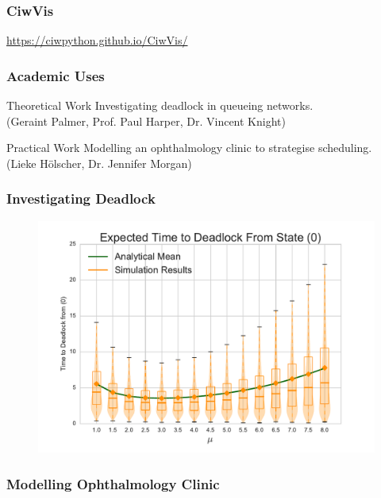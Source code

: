 \documentclass{beamer}
\begin{document}
\begin{frame}
\frametitle{CiwVis}
\begin{center}
\textcolor{darkorange}{\url{https://ciwpython.github.io/CiwVis/}}
\end{center}
\end{frame}


\begin{frame}
\frametitle{Academic Uses}
\vfill
\begin{block}{Theoretical Work}
Investigating deadlock in queueing networks.\\
(Geraint Palmer, Prof. Paul Harper, Dr. Vincent Knight)
\end{block}
\vfill
\begin{block}{Practical Work}
Modelling an ophthalmology clinic to strategise scheduling.\\
(Lieke H\"{o}lscher, Dr. Jennifer Morgan)
\end{block}
\vfill
\end{frame}


\begin{frame}
\frametitle{Investigating Deadlock}
\begin{figure}
    
\end{figure}
\end{frame}

\begin{frame}
\begin{figure}
    \includegraphics[width=\textwidth]{varymu_1Nms}
\end{figure}
\end{frame}

\begin{frame}
\frametitle{Modelling Ophthalmology Clinic}
\begin{figure}
    
\end{figure}
\end{frame}
\end{document}
